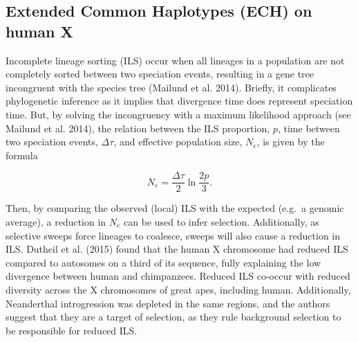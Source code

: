 \documentclass[
  11pt,
  a4paper,
]{scrbook}
\begin{document}
\subsection{Extended Common Haplotypes (ECH) on human
X}\label{extended-common-haplotypes-ech-on-human-x}

Incomplete lineage sorting (ILS) occur when all lineages in a population
are not completely sorted between two speciation events, resulting in a
gene tree incongruent with the species tree (Mailund et al. 2014).
Briefly, it complicates phylogenetic inference as it implies that
divergence time does represent speciation time. But, by solving the
incongruency with a maximum likelihood approach (see Mailund et al.
2014), the relation between the ILS proportion, \(p\), time between two
speciation events, \(\Delta\tau\), and effective population size,
\(N_e\), is given by the formula

\[
N_e = \frac{\Delta\tau}{2} \ln \frac{2p}{3}.
\]

Then, by comparing the observed (local) ILS with the expected (e.g.~a
genomic average), a reduction in \(N_e\) can be used to infer selection.
Additionally, as selective sweeps force lineages to coalesce, sweeps
will also cause a reduction in ILS. Dutheil et al. (2015) found that the
human X chromosome had reduced ILS compared to autosomes on a third of
its sequence, fully explaining the low divergence between human and
chimpanzees. Reduced ILS co-occur with reduced diversity across the X
chromosomes of great apes, including human. Additionally, Neanderthal
introgression was depleted in the same regions, and the authors suggest
that they are a target of selection, as they rule background selection
to be responsible for reduced ILS.
\end{document}
